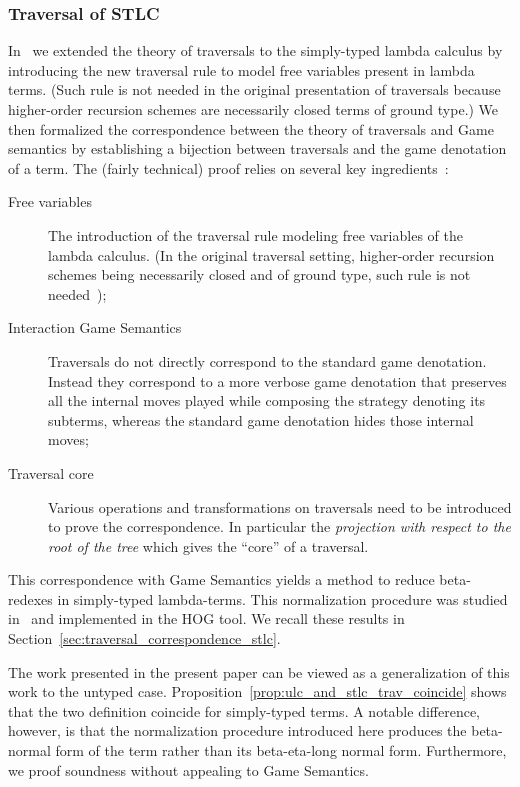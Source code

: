 \documentclass{article}
\theoremstyle{plain}
\theoremstyle{definition}
\theoremstyle{remark}
\begin{document}
\subsubsection{Traversal of STLC}

In~\cite{BlumPhd} we extended the theory of traversals to the simply-typed lambda calculus by introducing the new traversal rule  to model free variables present in lambda terms. (Such rule is not needed in the original presentation of traversals because higher-order recursion schemes are necessarily closed terms of ground type\cite{Ong2006}.) We then formalized the correspondence between the theory of traversals and Game semantics by establishing a bijection between traversals and the game denotation of a term. The (fairly technical) proof relies on several key ingredients~\cite{BlumPhd}:
\begin{description}
  \item[Free variables] The introduction of the traversal rule  modeling  free variables of the lambda calculus. (In the original traversal setting, higher-order recursion schemes being necessarily closed and of ground type, such rule is not needed~\cite{Ong2006});
  \item[Interaction Game Semantics] Traversals do not directly correspond to the standard game denotation. Instead they correspond to a more verbose game denotation that preserves all the internal moves played while composing the strategy denoting its subterms, whereas the standard game denotation hides those internal moves;
  \item[Traversal core] Various operations and transformations on traversals need to be introduced to prove the correspondence. In particular the \emph{projection with respect to the root of the tree} which gives the ``core'' of a traversal.
\end{description}

 This correspondence with Game Semantics yields a method to reduce beta-redexes in simply-typed lambda-terms. This normalization procedure was studied in~\cite{BlumPhd,BlumGalop2008,Blum-HogTool,Ong-NormByTrav2015} and implemented in the HOG tool\cite{BlumGalop2008, BlumPhd}. We recall these results in Section~\ref{sec:traversal_correspondence_stlc}.

The work presented in the present paper can be viewed as a generalization of this work to the untyped case. Proposition~\ref{prop:ulc_and_stlc_trav_coincide} shows that the two definition coincide for simply-typed terms.
A notable difference, however, is that the normalization procedure introduced here produces the beta-normal form of the term rather than its beta-eta-long normal form. Furthermore, we proof soundness without appealing to Game Semantics.
\end{document}
